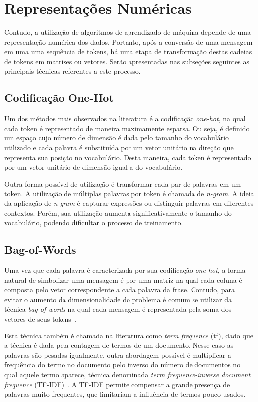 \section{Representações Numéricas}

Contudo, a utilização de algoritmos de aprendizado de máquina depende de uma representação numérica dos dados.
Portanto, após a conversão de uma mensagem em uma uma sequência de tokens, há uma etapa de transformação destas cadeias
de tokens em matrizes ou vetores.
Serão apresentadas nas subseções seguintes as principais técnicas referentes a este processo.

\subsection{Codificação One-Hot}

Um dos métodos mais observados na literatura é a codificação \textit{one-hot}, na qual cada token é representado de
maneira maximamente esparsa.
Ou seja, é definido um espaço cujo número de dimensão é dada pelo tamanho do vocabulário utilizado e cada palavra é
substituída por um vetor unitário na direção que representa sua posição no vocabulário.
Desta maneira, cada token é representado por um vetor unitário de dimensão igual a do vocabulário.

Outra forma possível de utilização é transformar cada par de palavras em um token.
A utilização de múltiplas palavras por token é chamada de \textit{n-gram}.
A ideia da aplicação de \textit{n-gram} é capturar expressões ou distinguir palavras em diferentes contextos.
Porém, sua utilização aumenta significativamente o tamanho do vocabulário, podendo dificultar o processo de treinamento.

\subsection{Bag-of-Words}

Uma vez que cada palavra é caracterizada por sua codificação \textit{one-hot}, a forma natural de simbolizar uma mensagem
é por uma matriz na qual cada coluna é composta pelo vetor correspondente a cada palavra da frase.
Contudo, para evitar o aumento da dimensionalidade do problema é comum se utilizar da técnica \textit{bag-of-words} na
qual cada mensagem é representada pela soma dos vetores de seus tokens~\cite{schutze08}.

Esta técnica também é chamada na literatura como \textit{term frequence} (tf), dado que a técnica é dada pela contagem
de termos de um documento.
Nesse caso as palavras são pesadas igualmente, outra abordagem possível é multiplicar a frequência do termo no documento
pelo inverso do número de documentos no qual aquele termo aparece, técnica denominada \textit{term frequence-inverse
document frequence} (TF-IDF)~\cite{salton88}.
A TF-IDF permite compensar a grande presença de palavras muito frequentes, que limitariam a influência de termos pouco
usados.

